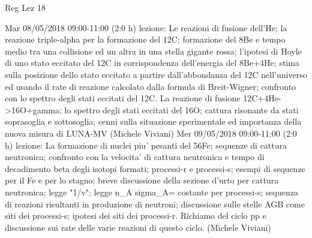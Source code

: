 \begin{frame}[allowframebreaks]{Reg Lez 18}
\begin{itemize}
    Mar 08/05/2018 09:00-11:00 (2:0 h) lezione: Le reazioni di fusione dell'He; la reazione triple-alpha per la formazione del 12C; formazione del 8Be e tempo medio tra una collisione ed un altra in una stella gigante rossa; l'ipotesi di Hoyle di uno stato eccitato del 12C in corrispondenza dell'energia del 8Be+4He; stima sulla posizione dello stato eccitato a partire dall'abbondanza del 12C nell'universo ed usando il rate di reazione calcolato dalla formula di Breit-Wigner; confronto con lo spettro degli stati eccitati del 12C. La reazione di fusione 12C+4He->16O+gamma; lo spettro degli stati eccitati del 16O; cattura risonante da stati soprasoglia e sottosoglia; cenni sulla situazione sperimentale ed importanza della nuova misura di LUNA-MV (Michele Viviani)
    Mer 09/05/2018 09:00-11:00 (2:0 h) lezione: La formazione di nuclei piu' pesanti del 56Fe; sequenze di cattura neutronica; confronto con la velocita' di cattura neutronica e tempo di decadimento beta degli isotopi formati; processi-r e processi-s; esempi di sequenze per il Fe e per lo stagno; breve discussione della sezione d'urto per cattura neutronica; legge "1/v"; legge n_A sigma_A= costante per processi-s; sequenza di reazioni risultanti in produzione di neutroni; discussione sulle stelle AGB come siti dei processi-s; ipotesi dei siti dei processi-r. Richiamo del ciclo pp e discussione sui rate delle varie reazioni di questo ciclo. (Michele Viviani)

\end{itemize}
\end{frame}